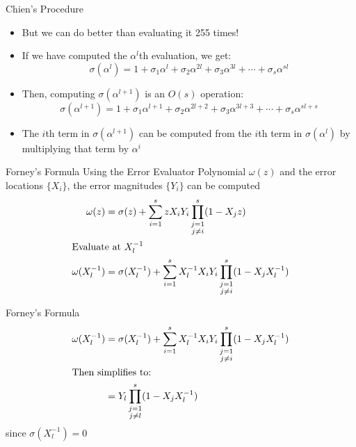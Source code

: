 \documentclass[]{prosper}
\begin{document}
\begin{slide}{Chien's Procedure}
\begin{itemize}
    \item But we can do better than evaluating it 255 times!
    \item If we have computed the $\alpha^l$th evaluation, we get:
    \[ \sigma(\alpha^l) = 1 + \sigma_1\alpha^l + \sigma_2\alpha^{2l} + \sigma_3\alpha^{3l} + \cdots + \sigma_s\alpha^{sl} \]
    \item Then, computing $\sigma(\alpha^{l+1})$ is an $O(s)$ operation:
    \[ \sigma(\alpha^{l+1}) = 1 + \sigma_1\alpha^{l+1} + \sigma_2\alpha^{2l+2} + \sigma_3\alpha^{3l+3} + \cdots + \sigma_s\alpha^{sl+s} \]
    \item The $i$th term in $\sigma(\alpha^{l+1})$ can be computed from the $i$th term in $\sigma(\alpha^l)$ by multiplying that term by $\alpha^i$
\end{itemize}
\end{slide}

\begin{slide}{Forney's Formula}
    Using the Error Evaluator Polynomial $\omega(z)$ and the error locations $\{X_i\}$, the error magnitudes $\{Y_i\}$ can be computed
    \begin{align*}
    \omega(z) &= \sigma(z) + \sum_{i=1}^s z X_i Y_i \prod_{\substack{j=1\\j \ne i}}^s (1 - X_j z) \\
    \intertext{Evaluate at $X_l^{-1}$}
    \omega(X_l^{-1}) &= \sigma(X_l^{-1}) + \sum_{i=1}^s X_l^{-1} X_i Y_i \prod_{\substack{j=1\\j \ne i}}^s (1 - X_j X_l^{-1})
    \end{align*}
\end{slide}

\begin{slide}{Forney's Formula}
    \begin{align*}
    \omega(X_l^{-1}) &= \sigma(X_l^{-1}) + \sum_{i=1}^s X_l^{-1} X_i Y_i \prod_{\substack{j=1\\j \ne i}}^s (1 - X_j X_l^{-1}) \\
    \intertext{Then simplifies to:}
    &= Y_l \prod_{\substack{j=1\\j \ne l}}^s (1 - X_j X_l^{-1} )
    \end{align*}
    since $\sigma(X_l^{-1}) = 0$
\end{slide}
\end{document}
